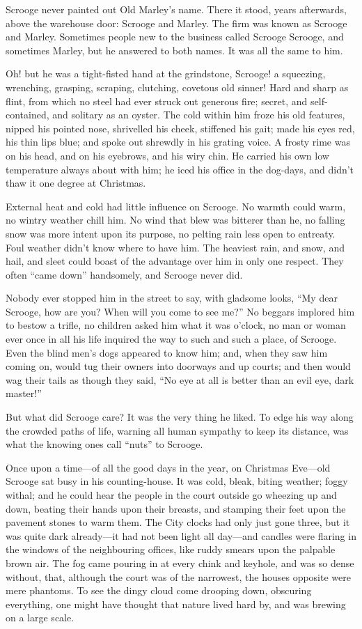 \documentclass[paper=5.5in:8.5in,BCOR=15mm,twoside,DIV=15,headinclude=off,12pt,chapterprefix=off,openany,headings=huge]{scrbook} %
\begin{document}
Scrooge never painted out Old Marley's name. There it stood, years afterwards, above the warehouse door: Scrooge and Marley. The firm was known as Scrooge and Marley. Sometimes people new to the business called Scrooge Scrooge, and sometimes Marley, but he answered to both names. It was all the same to him.

Oh! but he was a tight-fisted hand at the grindstone, Scrooge! a squeezing, wrenching, grasping, scraping, clutching, covetous old sinner! Hard and sharp as flint, from which no steel had ever struck out generous fire; secret, and self-contained, and solitary as an oyster. The cold within him froze his old features, nipped his pointed nose, shrivelled his cheek, stiffened his gait; made his eyes red, his thin lips blue; and spoke out shrewdly in his grating voice. A frosty rime was on his head, and on his eyebrows, and his wiry chin. He carried his own low temperature always about with him; he iced his office in the dog-days, and didn't thaw it one degree at Christmas.

External heat and cold had little influence on Scrooge. No warmth could warm, no wintry weather chill him. No wind that blew was bitterer than he, no falling snow was more intent upon its purpose, no pelting rain less open to entreaty. Foul weather didn't know where to have him. The heaviest rain, and snow, and hail, and sleet could boast of the advantage over him in only one respect. They often \enquote{came down} handsomely, and Scrooge never did.

Nobody ever stopped him in the street to say, with gladsome looks, \enquote{My dear Scrooge, how are you? When will you come to see me?} No beggars implored him to bestow a trifle, no children asked him what it was o'clock, no man or woman ever once in all his life inquired the way to such and such a place, of Scrooge. Even the blind men's dogs appeared to know him; and, when they saw him coming on, would tug their owners into doorways and up courts; and then would wag their tails as though they said, \enquote{No eye at all is better than an evil eye, dark master!}

But what did Scrooge care? It was the very thing he liked. To edge his way along the crowded paths of life, warning all human sympathy to keep its distance, was what the knowing ones call \enquote{nuts} to Scrooge.

Once upon a time—of all the good days in the year, on Christmas Eve—old Scrooge sat busy in his counting-house. It was cold, bleak, biting weather; foggy withal; and he could hear the people in the court outside go wheezing up and down, beating their hands upon their breasts, and stamping their feet upon the pavement stones to warm them. The City clocks had only just gone three, but it was quite dark already—it had not been light all day—and candles were flaring in the windows of the neighbouring offices, like ruddy smears upon the palpable brown air. The fog came pouring in at every chink and keyhole, and was so dense without, that, although the court was of the narrowest, the houses opposite were mere phantoms. To see the dingy cloud come drooping down, obscuring everything, one might have thought that nature lived hard by, and was brewing on a large scale.
\end{document}
